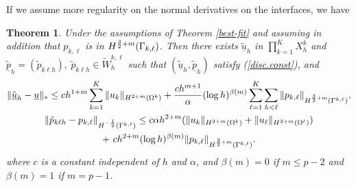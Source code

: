 \documentclass[final]{siamltex}
\newtheorem{theo}{Theorem}
\begin{document}
If we assume more regularity on the normal derivatives on the interfaces,
we have
\begin{theo}
\label{best-fit.2}
Under the assumptions of Theorem \ref{best-fit} and assuming in addition that 
$p_{k,\ell}$ is in $H^{{3 \over 2}+m}(\Gamma_{k,\ell})$.
Then there exists $\tilde{{\underline u}}_h$ in
$\prod_{k=1}^K X_h^k$
and $\tilde{{\underline p}}_h=(\tilde{p}_{k \ell h}), \  \tilde{p}_{k \ell h} \in
\tilde W_h^{k,\ell}$
such that $(\tilde{{\underline u}}_h,\tilde{{\underline p}}_h)$ satisfy
(\ref{disc.const}), and
\begin{multline*}
\| \tilde{{\underline u}}_h -{{\underline u}}\|_*
\le
c h^{1+m} \sum_{k=1}^K \| u_k \|_{H^{2+m}(\Omega^k)}
+{c h^{m+1} \over \alpha}(\log h)^{\beta(m)} \sum_{\ell=1}^K\sum_{k < \ell} \| p_{k,\ell}
\|_{H^{{3\over 2}+m}(\Gamma^{k,\ell})},
\\
\| \tilde{p}_{k \ell h} - p_{k,\ell} \|_{H^{-{1 \over 2}}(\Gamma^{k,\ell})}
\le
c\alpha h^{2+m} (\|u_k\|_{H^{2+m}(\Omega^k)}
+\|u_{\ell}\|_{H^{2+m}(\Omega^{\ell})}) \\
 + \ c h^{2+m} (\log h)^{\beta(m)}\| p_{k,\ell} \|_{H^{{3 \over2}+m}(\Gamma^{k,\ell})}.
\end{multline*}
where $c$ is a constant independent of $h$ and $\alpha$, and $\beta(m)=0$ if
$m\le p-2$ and $\beta(m)=1$ if $m=p-1$.
\end{theo}
\end{document}
